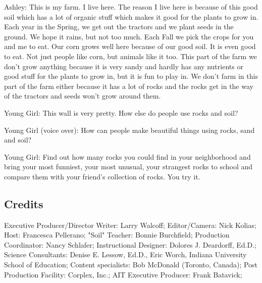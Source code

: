Ashley: This is my farm. I live here. The reason I live here is because of this good soil which has a lot of organic stuff which makes it good for the plants to grow in. Each year in the Spring, we get out the tractors and we plant seeds in the ground. We hope it rains, but not too much. Each Fall we pick the crops for you and me to eat. Our corn grows well here because of our good soil. It is even good to eat. Not just people like corn, but animals like it too. This part of the farm we don't grow anything because it is very sandy and hardly has any nutrients or good stuff for the plants to grow in, but it is fun to play in. We don't farm in this part of the farm either because it has a lot of rocks and the rocks get in the way of the tractors and seeds won't grow around them.

Young Girl: This wall is very pretty. How else do people use rocks and soil?

Young Girl (voice over): How can people make beautiful things using rocks, sand and soil?

Young Girl: Find out how many rocks you could find in your neighborhood and bring your most funniest, your most unusual, your strangest rocks to school and compare them with your friend's collection of rocks. You try it.

\subsection{Credits}

Executive Producer/Director Writer: Larry Walcoff;
Editor/Camera: Nick Kolias;
Host: Francesca Pellerano;
"Soil" Teacher: Bonnie Burchfield;
Production Coordinator: Nancy Schlafer;
Instructional Designer: Dolores J. Deardorff, Ed.D.;
Science Consultants: Denise E. Lessow, Ed.D., Eric Worch, Indiana University School of Education;
Content specialists: Bob McDonald (Toronto, Canada);
Post Production Facility: Corplex, Inc.;
AIT Executive Producer: Frank Batavick;